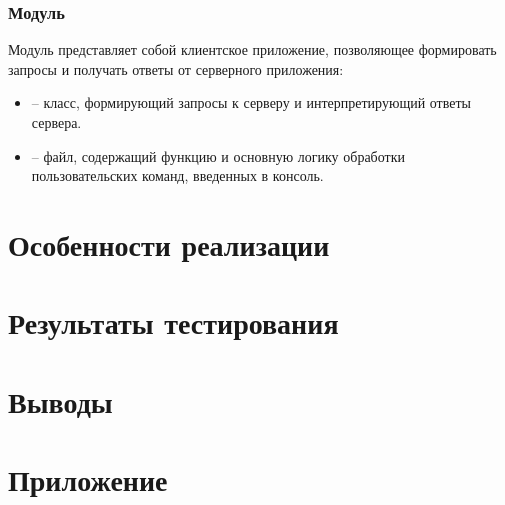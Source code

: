 \subsubsection{Модуль }

Модуль  представляет собой клиентское приложение, позволяющее формировать запросы и получать ответы от серверного приложения:
\begin{itemize}
	\item {} -- класс, формирующий запросы к серверу и интерпретирующий ответы сервера.
	\item {} -- файл, содержащий функцию  и основную логику обработки пользовательских команд, введенных в консоль.
\end{itemize}

\section{Особенности реализации}


\section{Результаты тестирования}


\section{Выводы}


\newpage

\section*{Приложение}



